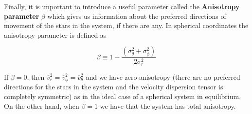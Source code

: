 Finally, it is important to introduce a useful parameter called the \textbf{Anisotropy parameter} $\beta$ which gives us information about the preferred directions of movement of the stars in the system, if there are any. In spherical coordinates the anisotropy parameter is defined as

\begin{equation}
\beta \equiv 1-\frac{\left(\sigma_{\theta}^{2}+\sigma_{\phi}^{2}\right)}{2\sigma_{r}^{2}}
\end{equation}

If $\beta=0$, then $\overline{v}_{r}^{2}=\overline{v}_{\phi}^{2}=\overline{v}_{\theta}^{2}$ and we have zero anisotropy (there are no preferred directions for the stars in the system and the velocity dispersion tensor is completely symmetric) as in the ideal case of a spherical system in equilibrium. On the other hand, when $\beta=1$ we have that the system has total anisotropy.

